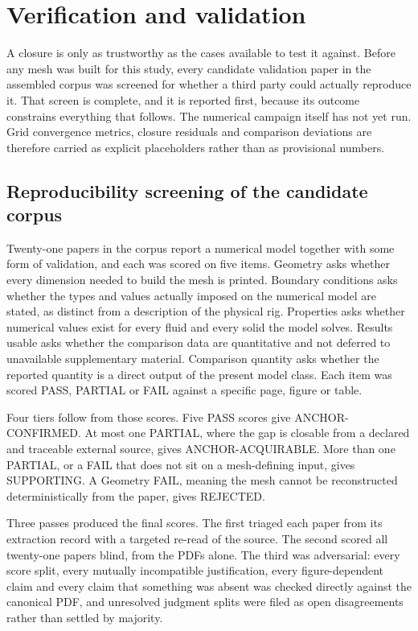 \section{Verification and validation}
\label{sec:verification}

A closure is only as trustworthy as the cases available to test it against. Before any mesh was
built for this study, every candidate validation paper in the assembled corpus was screened for
whether a third party could actually reproduce it. That screen is complete, and it is reported
first, because its outcome constrains everything that follows. The numerical campaign itself has
not yet run. Grid convergence metrics, closure residuals and comparison deviations are therefore
carried as explicit placeholders rather than as provisional numbers.

\subsection{Reproducibility screening of the candidate corpus}
\label{sec:vv-ladder}

Twenty-one papers in the corpus report a numerical model together with some form of validation,
and each was scored on five items. Geometry asks whether every dimension needed to build the mesh
is printed. Boundary conditions asks whether the types and values actually imposed on the
numerical model are stated, as distinct from a description of the physical rig. Properties asks
whether numerical values exist for every fluid and every solid the model solves. Results usable
asks whether the comparison data are quantitative and not deferred to unavailable supplementary
material. Comparison quantity asks whether the reported quantity is a direct output of the present
model class. Each item was scored PASS, PARTIAL or FAIL against a specific page, figure or table.

Four tiers follow from those scores. Five PASS scores give ANCHOR-CONFIRMED. At most one PARTIAL,
where the gap is closable from a declared and traceable external source, gives
ANCHOR-ACQUIRABLE. More than one PARTIAL, or a FAIL that does not sit on a mesh-defining input,
gives SUPPORTING. A Geometry FAIL, meaning the mesh cannot be reconstructed deterministically
from the paper, gives REJECTED.

Three passes produced the final scores. The first triaged each paper from its extraction record
with a targeted re-read of the source. The second scored all twenty-one papers blind, from the
PDFs alone. The third was adversarial: every score split, every mutually incompatible
justification, every figure-dependent claim and every claim that something was absent was checked
directly against the canonical PDF, and unresolved judgment splits were filed as open
disagreements rather than settled by majority.

